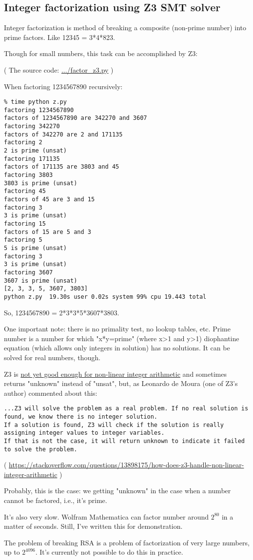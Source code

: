 \subsection{Integer factorization using Z3 SMT solver}
\label{factor_Z3}

Integer factorization is method of breaking a composite (non-prime number) into prime factors.
Like 12345 = 3*4*823.

Though for small numbers, this task can be accomplished by Z3:



( The source code: \url{.../factor_z3.py} )

When factoring 1234567890 recursively:

\begin{lstlisting}
% time python z.py
factoring 1234567890
factors of 1234567890 are 342270 and 3607
factoring 342270
factors of 342270 are 2 and 171135
factoring 2
2 is prime (unsat)
factoring 171135
factors of 171135 are 3803 and 45
factoring 3803
3803 is prime (unsat)
factoring 45
factors of 45 are 3 and 15
factoring 3
3 is prime (unsat)
factoring 15
factors of 15 are 5 and 3
factoring 5
5 is prime (unsat)
factoring 3
3 is prime (unsat)
factoring 3607
3607 is prime (unsat)
[2, 3, 3, 5, 3607, 3803]
python z.py  19.30s user 0.02s system 99% cpu 19.443 total
\end{lstlisting}

So, 1234567890 = 2*3*3*5*3607*3803.

One important note: there is no primality test, no lookup tables, etc.
Prime number is a number for which "x*y=prime" (where x>1 and y>1) diophantine equation (which allows only integers in solution) has no solutions.
It can be solved for real numbers, though.

Z3 is \href{https://github.com/Z3Prover/z3/issues/1264}{not yet good enough for non-linear integer arithmetic}
and sometimes returns "unknown" instead of "unsat", but,
as Leonardo de Moura (one of Z3's author) commented about this:

\begin{lstlisting}
...Z3 will solve the problem as a real problem. If no real solution is found, we know there is no integer solution.
If a solution is found, Z3 will check if the solution is really assigning integer values to integer variables.
If that is not the case, it will return unknown to indicate it failed to solve the problem.
\end{lstlisting}
( \url{https://stackoverflow.com/questions/13898175/how-does-z3-handle-non-linear-integer-arithmetic} )

Probably, this is the case: we getting "unknown" in the case when a number cannot be factored, i.e., it's prime.

It's also very slow. Wolfram Mathematica can factor number around $2^{80}$ in a matter of seconds.
Still, I've written this for demonstration.

The problem of breaking \ac{RSA} is a problem of factorization of very large numbers, up to $2^{4096}$.
It's currently not possible to do this in practice.

